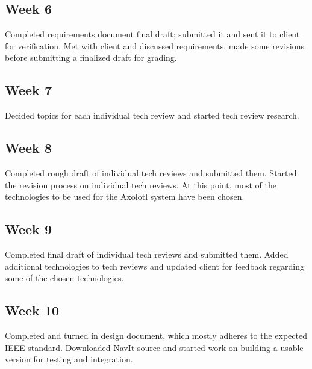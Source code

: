 \documentclass[onecolumn, draftclsnofoot,10pt, compsoc]{IEEEtran}
\begin{document}
\subsection{Week 6}
Completed requirements document final draft; submitted it and sent it to client for verification. Met with client and discussed requirements, made some revisions before submitting a finalized draft for grading.

\subsection{Week 7}
Decided topics for each individual tech review and started tech review research. 

\subsection{Week 8}
Completed rough draft of individual tech reviews and submitted them. Started the revision process on individual tech reviews. At this point, most of the technologies to be used for the Axolotl system have been chosen.

\subsection{Week 9}
Completed final draft of individual tech reviews and submitted them. Added additional technologies to tech reviews and updated client for feedback regarding some of the chosen technologies.

\subsection{Week 10}
Completed and turned in design document, which mostly adheres to the expected IEEE standard. Downloaded NavIt source and started work on building a usable version for testing and integration.
\end{document}
